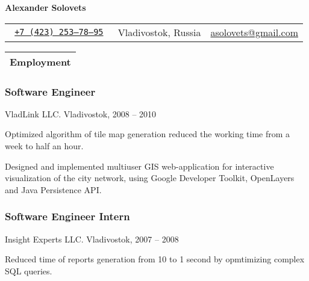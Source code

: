 \documentclass[a4paper]{article}
\def\name{Alexander Solovets}
\begin{document}
\color{dark-gray}
\sf

\begin{center}
	{\Huge \bfseries \name}
	\vskip 4pt
	\begin{tabular}{r|c|r}
		\tt
		\href{tel:+7-423-253-78-95}{+7 (423) 253--78--95} & Vladivostok, Russia & \href{mailto:asolovets@gmail.com}{asolovets@gmail.com}\\
	\end{tabular}
\end{center}

\small

	\begin{tabularx}{\textwidth}{@{}X}
		\textbf{\color{black}\large Employment}\\
		\hline
	\end{tabularx}
		\begin{multicols}{2}
			\raggedcolumns
			\subsubsection*{Software Engineer}
			{\color{black}VladLink LLC. Vladivostok, 2008 -- 2010}
			\begin{items}
				\item Optimized algorithm of tile map generation reduced the working time from a week to half an hour.
				\item Designed and implemented multiuser GIS web-application for interactive visualization of the city network, using Google Developer Toolkit, OpenLayers and Java Persistence API.
			\end{items}

			\columnbreak

			\subsubsection*{Software Engineer Intern}
			{\color{black}Insight Experts LLC. Vladivostok, 2007 -- 2008}
			\begin{items}
				\item Reduced time of reports generation from 10 to 1 second by opmtimizing complex SQL queries.
			\end{items}
		\end{multicols}
\end{document}
